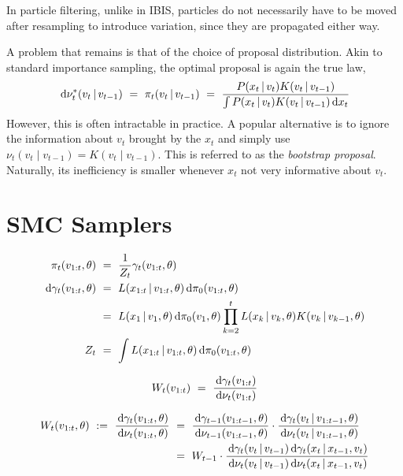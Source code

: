 In particle filtering, unlike in IBIS, particles do not necessarily have to be moved after resampling to introduce variation, since they are propagated either way.

A problem that remains is that of the choice of proposal distribution. Akin to standard importance sampling, the optimal proposal is again the true law,
\begin{equation*}
\, \textrm{d} \nu_t^*(v_t \,|\, v_{t-1}) ~ = ~ \pi_t(v_t \,|\, v_{t-1}) ~ = ~ \frac{P(x_t \,|\, v_t) K(v_t \,|\, v_{t-1})}{\int P(x_t \,|\, v_t) K(v_t \,|\, v_{t-1}) \, \textrm{d} x_t}
\end{equation*}
However, this is often intractable in practice. A popular alternative is to ignore the information about $v_t$ brought by the $x_t$ and simply use $\nu_t(v_t \mid v_{t-1}) = K(v_t \mid v_{t-1})$. This is referred to as the \emph{bootstrap proposal}. Naturally, its inefficiency is smaller whenever $x_t$ not very informative about $v_t$.


\section{SMC Samplers}

\begin{align*}
\pi_t(v_{1:t}, \theta) ~ &= ~ \frac{1}{Z_t} \gamma_t(v_{1:t}, \theta) \\
\, \textrm{d} \gamma_t(v_{1:t}, \theta) ~ &= ~ L(x_{1:t} \,|\, v_{1:t}, \theta) \, \textrm{d} \pi_0(v_{1:t}, \theta) \\
	&= ~ L(x_1 \,|\, v_1, \theta) \, \textrm{d} \pi_0(v_1, \theta) \prod_{k=2}^t L(x_k \,|\, v_k, \theta) K(v_k \,|\, v_{k-1}, \theta) \\
Z_t ~ &= ~ \int L(x_{1:t} \,|\, v_{1:t}, \theta) \, \textrm{d} \pi_0(v_{1:t}, \theta)
\end{align*}

\begin{align*}
W_t(v_{1:t}) ~ = ~ \frac{\, \textrm{d} \gamma_t(v_{1:t})}{\, \textrm{d} \nu_t(v_{1:t})}
\end{align*}

\begin{align*}
W_t(v_{1:t}, \theta) ~ := ~ \frac{\, \textrm{d} \gamma_t(v_{1:t}, \theta)}{\, \textrm{d} \nu_t(v_{1:t}, \theta)} ~ &= ~ \frac{\, \textrm{d} \gamma_{t-1}(v_{1:t-1}, \theta)}{\, \textrm{d} \nu_{t-1}(v_{1:t-1}, \theta)} \cdot \frac{\, \textrm{d} \gamma_t(v_t \,|\, v_{1:t-1}, \theta)}{\, \textrm{d} \nu_t(v_t \,|\, v_{1:t-1}, \theta)} \\
	&= ~ W_{t-1} \cdot \frac{\, \textrm{d} \gamma_t(v_t \,|\, v_{t-1}) \, \textrm{d} \gamma_t(x_t \,|\, x_{t-1}, v_t)}{\, \textrm{d} \nu_t(v_t \,|\, v_{t-1}) \, \textrm{d} \nu_t(x_t \,|\, x_{t-1}, v_t)}
\end{align*}

